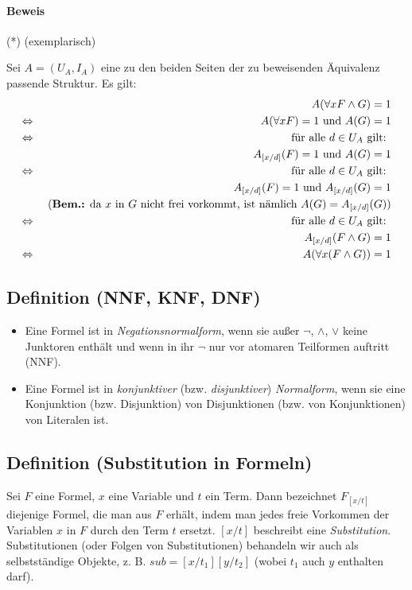 \documentclass[a4paper,twoside,DIV15,BCOR12mm]{scrbook}
\begin{document}
\paragraph{Beweis} (*) (exemplarisch)

Sei $A=(U_A,I_A)$ eine zu den beiden Seiten der zu beweisenden Äquivalenz passende Struktur. Es gilt:
\begin{eqnarray*}
	& &A(\forall xF \wedge G) = 1 \\
	\Leftrightarrow & & A(\forall xF) = 1 \text{ und } A(G) = 1 \\
	\Leftrightarrow & & \text{ für alle } d\in U_A \text{ gilt: } \\
	& & A_{[x/d]}(F) = 1 \text{ und } A(G) = 1 \\
	\Leftrightarrow & & \text{ für alle } d\in U_A \text{ gilt: } \\
	& & A_{[x/d]}(F) = 1 \text{ und } A_{[x/d]}(G) = 1\\
	& & \text{\ (\textbf{Bem.:} da $x$ in $G$ nicht frei vorkommt, ist nämlich $A(G)=A_{[x/d]}(G)$)} \\
	\Leftrightarrow & & \text{ für alle } d\in U_A \text{ gilt: } \\
	& & A_{[x/d]}(F\wedge G) = 1 \\
	\Leftrightarrow & & A(\forall x(F\wedge G)) = 1
\end{eqnarray*}

\subsection{Definition (NNF, KNF, DNF)}

\begin{itemize}
\item Eine Formel ist in \emph{Negationsnormalform}, wenn sie außer $\neg$, $\wedge$, $\vee$ keine Junktoren enthält und wenn in ihr $\neg$ nur vor atomaren Teilformen auftritt (NNF).
\item Eine Formel ist in \emph{konjunktiver} (bzw. \emph{disjunktiver}) \emph{Normalform}, wenn sie eine Konjunktion (bzw. Disjunktion) von Disjunktionen (bzw. von Konjunktionen) von Literalen ist.
\end{itemize}

\subsection{Definition (Substitution in Formeln)}

Sei $F$ eine Formel, $x$ eine Variable und $t$ ein Term. Dann bezeichnet $F_{[x/t]}$ diejenige Formel, die man aus $F$ erhält, indem man jedes freie Vorkommen der Variablen $x$ in $F$ durch den Term $t$ ersetzt. $[x/t]$ beschreibt eine \emph{Substitution}. Substitutionen (oder Folgen von Substitutionen) behandeln wir auch als selbstständige Objekte, z. B. $sub=[x/t_1][y/t_2]$ (wobei $t_1$ auch $y$ enthalten darf).
\end{document}

